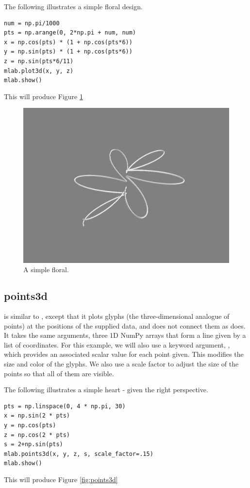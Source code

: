 The following illustrates a simple floral design.
\begin{lstlisting}
num = np.pi/1000
pts = np.arange(0, 2*np.pi + num, num)
x = np.cos(pts) * (1 + np.cos(pts*6))
y = np.sin(pts) * (1 + np.cos(pts*6))
z = np.sin(pts*6/11)
mlab.plot3d(x, y, z)
mlab.show()
\end{lstlisting}
This will produce Figure \ref{fig:plot3d}
\begin{figure}
\includegraphics[width=\textwidth]{plot3d.png}
\caption{A simple floral.}
\label{fig:plot3d}
\end{figure}


\subsection*{points3d}
 is similar to , except that it plots glyphs (the three-dimensional analogue of points) at the positions of the supplied data, and does not connect them as  does.
It takes the same arguments, three 1D NumPy arrays that form a line given by a list of  coordinates.
For this example, we will also use a keyword argument, , which provides an associated scalar value for each point given.
This modifies the size and color of the glyphs.
We also use a scale factor to adjust the size of the points so that all of them are visible.

The following illustrates a simple heart - given the right perspective.
\begin{lstlisting}
pts = np.linspace(0, 4 * np.pi, 30)
x = np.sin(2 * pts)
y = np.cos(pts)
z = np.cos(2 * pts)
s = 2+np.sin(pts)
mlab.points3d(x, y, z, s, scale_factor=.15)
mlab.show()
\end{lstlisting}
This will produce Figure \ref{fig:points3d}

